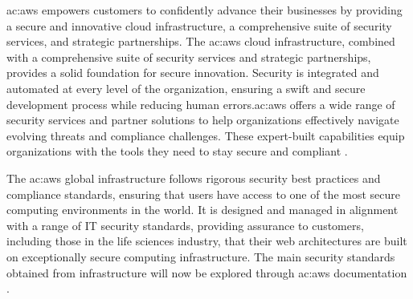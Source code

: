 \gls{ac:aws} empowers customers to confidently advance their businesses by providing a secure and innovative cloud infrastructure, a comprehensive suite of security services, and strategic partnerships. The \gls{ac:aws} cloud infrastructure, combined with a comprehensive suite of security services and strategic partnerships, provides a solid foundation for secure innovation. Security is integrated and automated at every level of the organization, ensuring a swift and secure development process while reducing human errors.\gls{ac:aws} offers a wide range of security services and partner solutions to help organizations effectively navigate evolving threats and compliance challenges. These expert-built capabilities equip organizations with the tools they need to stay secure and compliant \cite{AWSSecurity}.

The \gls{ac:aws} global infrastructure follows rigorous security best practices and compliance standards, ensuring that users have access to one of the most secure computing environments in the world. It is designed and managed in alignment with a range of IT security standards, providing assurance to customers, including those in the life sciences industry, that their web architectures are built on exceptionally secure computing infrastructure. The main security standards obtained from infrastructure will now be explored through \gls{ac:aws} documentation \cite{AWSCertificationsAndAttestations}. 
